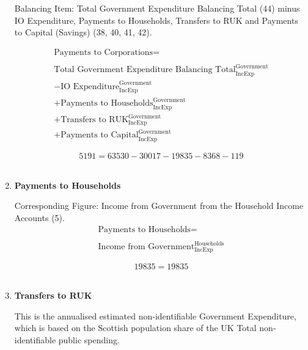 \begin{enumerate}
Balancing Item:  Total Government Expenditure Balancing Total (44) minus IO Expenditure, Payments to Households, Transfers to RUK and Payments to Capital (Savings) (38, 40, 41, 42).

\begin{equation}
\begin{split}
\text{Payments to Corporations} =  \\ \\
\text{Total Government Expenditure Balancing Total}^\text{Government}_\text{IncExp}\\
-\text{IO Expenditure}^\text{Government}_\text{IncExp}\\
+\text{Payments to Households}^\text{Government}_\text{IncExp}\\
+\text{Transfers to RUK}^\text{Government}_\text{IncExp}\\
+\text{Payments to Capital}^\text{Government}_\text{IncExp}
\end{split} \label{eq:2.5.43}
\end{equation}

\begin{equation} \nonumber
5191 = 63530-30017-19835-8368-119
\end{equation}\\


\item \textbf {Payments to Households}

Corresponding Figure: Income from Government from the Household Income Accounts (5).\\

\begin{equation}
\begin{split}
\text{Payments to Households} =  \\ \\
\text{Income from Government}^\text{Households}_\text{IncExp}
\end{split} \label{eq:2.5.44}
\end{equation}

\begin{equation} \nonumber
19835 = 19835
\end{equation}\\


\item \textbf {Transfers to RUK}

This is the annualised estimated non-identifiable Government Expenditure, which is based on the Scottish population share of the UK Total non-identifiable public spending. \cite{ScotGov2013b}


\end{enumerate}
